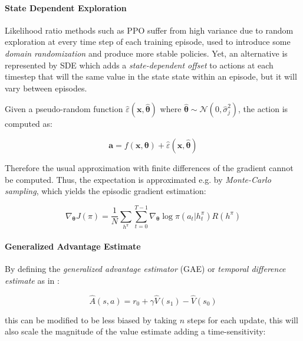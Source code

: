 \paragraph{State Dependent Exploration} Likelihood ratio methods such as \ac{PPO} suffer from high variance due to random exploration at every time step of each training episode, used to introduce some \textit{domain randomization} and produce more stable policies. Yet, an alternative is represented by \ac{SDE} \citep{daelemans_state-dependent_2008, raffin_smooth_2021} which adds a \textit{state-dependent offset} to actions at each timestep that will the same value in the state state within an episode, but it will vary between episodes.

Given a pseudo-random function $\hat{\varepsilon}(\mathbf{x}, \hat{\boldsymbol{\theta}})$ where $\hat{\boldsymbol{\theta}} \sim \mathcal{N}(0, \hat{\sigma} _j ^2)$, the action is computed as:

\begin{equation}
    \mathbf{a} = f(\mathbf{x}, \boldsymbol{\theta}) + \hat{\varepsilon}(\mathbf{x}, \hat{\boldsymbol{\theta}})
\end{equation}


Therefore the usual approximation with finite differences of the gradient cannot be computed. Thus, the expectation is approximated e.g. by \textit{Monte-Carlo sampling}, which yields \citep{williams_simple_1992} the episodic gradient estimation:

\begin{equation}
    \nabla _{\boldsymbol{\theta}} J(\pi) = \frac{1}{N} \sum _{h^{\pi}} \sum ^{T-1} _{t = 0} \nabla _{\boldsymbol{\theta}} \log \pi(a _t | h _t ^{\pi}) R(h ^{\pi})
\end{equation}

\paragraph{Generalized Advantage Estimate}
By defining the \textit{generalized advantage estimator} (\ac{GAE}) or \textit{temporal difference estimate} as in \cite{schulman_high-dimensional_2018}:

\begin{equation}
    \hat{A}(s,a) = r _0 + \gamma \hat{V}(s _1) - \hat{V}(s _0)
\end{equation}

this can be modified to be less biased by taking $n$ steps for each update, this will also scale the magnitude of the value estimate adding a time-sensitivity:

